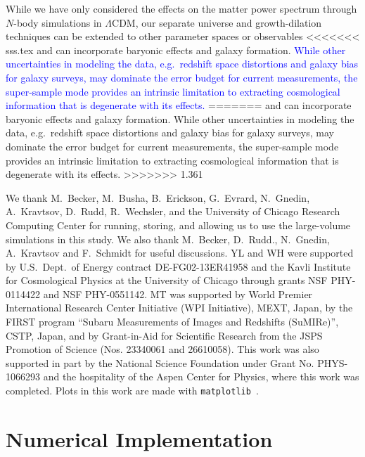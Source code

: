 \documentclass[prd,twocolumn,amsmath,amssymb,floatfix,superscriptaddress]{revtex4-1}
\newcommand{\wh}[1]{\textcolor{blue}{#1}}
\begin{document}
{{While we have only considered the effects on the matter power spectrum through
$N$-body simulations in $\Lambda$CDM, our separate universe and growth-dilation techniques can be extended to other parameter spaces or observables
<<<<<<< sss.tex
and can incorporate baryonic effects and galaxy formation. \wh{While other uncertainties in modeling the data, e.g.\ redshift space distortions and galaxy bias for galaxy surveys,
may  dominate the error budget for current measurements, the super-sample mode provides
an intrinsic limitation to extracting cosmological information that is degenerate with its effects.}
=======
and can incorporate baryonic effects and galaxy formation. While other uncertainties in modeling the data, e.g.\ redshift space distortions and galaxy bias for galaxy surveys,
may  dominate the error budget for current measurements, the super-sample mode provides
an intrinsic limitation to extracting cosmological information that is degenerate with its effects.
>>>>>>> 1.361



\vfill

We thank M.\ Becker, M.\ Busha, B.\ Erickson,  G.\ Evrard, N.\ Gnedin,  A.\ Kravtsov,
D.\ Rudd,  R.\ Wechsler,  and the University of Chicago
Research Computing Center   for running, storing, and
allowing us to use the large-volume simulations in this study. 
{We also thank M.\ Becker, D.\ Rudd., N.\ Gnedin, A.\ Kravtsov and F.\ Schmidt for useful discussions.}
YL and WH  were supported
 by U.S.~Dept.\ of Energy
 contract DE-FG02-13ER41958
 and the
 Kavli Institute for Cosmological Physics at the University of
 Chicago through grants NSF PHY-0114422 and NSF PHY-0551142.   MT was
 supported by World Premier International Research Center Initiative
 (WPI Initiative), MEXT, Japan, by the FIRST program “Subaru
 Measurements of Images and Redshifts (SuMIRe)”, CSTP, Japan, and by
 Grant-in-Aid for Scientific Research from the JSPS Promotion of Science
 (Nos. 23340061 and 26610058). 
This work was also supported in part by the National Science Foundation
under Grant No. PHYS-1066293 and the hospitality of the Aspen Center for
Physics, where this work was completed. 
Plots in this work are made with \texttt{matplotlib}~\cite{Hunter:2007}.


\vfill


\appendix
\section{Numerical Implementation}
\label{app:sim}

}}
\end{document}
